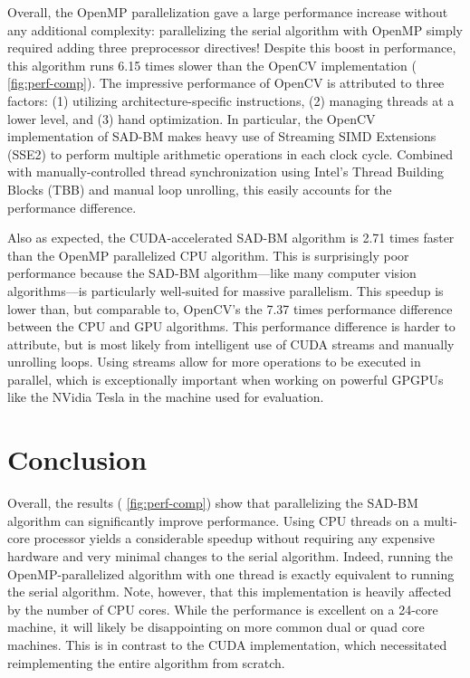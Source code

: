\documentclass{article}
\let\orgautoref\autoref
\providecommand{\Cref}
        {\def\equationautorefname{Equation}%
         \def\figureautorefname{Figure}%
         \def\subfigureautorefname{Figure}%
         \def\Itemautorefname{Item}%
         \def\tableautorefname{Table}%
         \def\sectionautorefname{Section}%
         \def\subsectionautorefname{Section}%
         \def\subsubsectionautorefname{Section}%
         \def\chapterautorefname{Section}%
         \def\partautorefname{Part}%
         \orgautoref}
\begin{document}
Overall, the OpenMP parallelization gave a large performance increase without
any additional complexity: parallelizing the serial algorithm with OpenMP
simply required adding three preprocessor directives! Despite this boost in
performance, this algorithm runs 6.15 times slower than the OpenCV
implementation (\Cref{fig:perf-comp}). The impressive performance of OpenCV
is attributed to three factors: (1) utilizing architecture-specific
instructions, (2) managing threads at a lower level, and (3) hand optimization.
In particular, the OpenCV implementation of SAD-BM makes heavy use of Streaming
SIMD Extensions (SSE2) to perform multiple arithmetic operations in each clock
cycle. Combined with manually-controlled thread synchronization using Intel's
Thread Building Blocks (TBB) and manual loop unrolling, this easily accounts
for the performance difference.

Also as expected, the CUDA-accelerated SAD-BM algorithm is 2.71 times faster
than the OpenMP parallelized CPU algorithm. This is surprisingly poor
performance because the SAD-BM algorithm---like many computer vision
algorithms---is particularly well-suited for massive parallelism. This speedup
is lower than, but comparable to, OpenCV's the 7.37 times performance
difference between the CPU and GPU algorithms. This performance difference is
harder to attribute, but is most likely from intelligent use of CUDA streams
and manually unrolling loops. Using streams allow for more operations to be
executed in parallel, which is exceptionally important when working on powerful
GPGPUs like the NVidia Tesla in the machine used for evaluation.

\section{Conclusion}
\label{sec:conc}
Overall, the results (\Cref{fig:perf-comp}) show that parallelizing the
SAD-BM algorithm can significantly improve performance. Using CPU threads on a
multi-core processor yields a considerable speedup without requiring any
expensive hardware and very minimal changes to the serial algorithm. Indeed,
running the OpenMP-parallelized algorithm with one thread is exactly equivalent
to running the serial algorithm. Note, however, that this implementation is
heavily affected by the number of CPU cores. While the performance is excellent
on a 24-core machine, it will likely be disappointing on more common dual or
quad core machines. This is in contrast to the CUDA implementation, which
necessitated reimplementing the entire algorithm from scratch.
\end{document}
